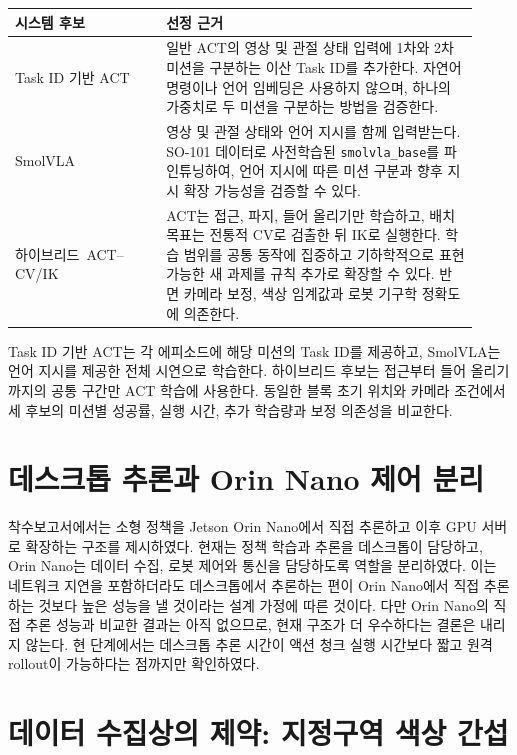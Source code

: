 \documentclass[titlepage]{pnureport}
\begin{document}
\begingroup
\small
\begin{longtable}{>{\raggedright\arraybackslash}p{0.30\linewidth}p{0.62\linewidth}}
\toprule
시스템 후보 & 선정 근거 \\
\midrule
\endhead
Task ID 기반 ACT & 일반 ACT의 영상 및 관절 상태 입력에 1차와 2차 미션을 구분하는 이산 Task ID를 추가한다. 자연어 명령이나 언어 임베딩은 사용하지 않으며, 하나의 가중치로 두 미션을 구분하는 방법을 검증한다. \\
SmolVLA & 영상 및 관절 상태와 언어 지시를 함께 입력받는다. SO-101 데이터로 사전학습된 \texttt{smolvla\_base}를 파인튜닝하여, 언어 지시에 따른 미션 구분과 향후 지시 확장 가능성을 검증할 수 있다. \\
\mbox{하이브리드 ACT--CV/IK} & ACT는 접근, 파지, 들어 올리기만 학습하고, 배치 목표는 전통적 CV로 검출한 뒤 IK로 실행한다. 학습 범위를 공통 동작에 집중하고 기하학적으로 표현 가능한 새 과제를 규칙 추가로 확장할 수 있다. 반면 카메라 보정, 색상 임계값과 로봇 기구학 정확도에 의존한다. \\
\bottomrule
\end{longtable}
\endgroup

Task ID 기반 ACT는 각 에피소드에 해당 미션의 Task ID를 제공하고, SmolVLA는 언어 지시를 제공한 전체 시연으로 학습한다. 하이브리드 후보는 접근부터 들어 올리기까지의 공통 구간만 ACT 학습에 사용한다. 동일한 블록 초기 위치와 카메라 조건에서 세 후보의 미션별 성공률, 실행 시간, 추가 학습량과 보정 의존성을 비교한다.

\section{데스크톱 추론과 Orin Nano 제어 분리}

착수보고서에서는 소형 정책을 Jetson Orin Nano에서 직접 추론하고 이후 GPU 서버로 확장하는 구조를 제시하였다. 현재는 정책 학습과 추론을 데스크톱이 담당하고, Orin Nano는 데이터 수집, 로봇 제어와 통신을 담당하도록 역할을 분리하였다. 이는 네트워크 지연을 포함하더라도 데스크톱에서 추론하는 편이 Orin Nano에서 직접 추론하는 것보다 높은 성능을 낼 것이라는 설계 가정에 따른 것이다. 다만 Orin Nano의 직접 추론 성능과 비교한 결과는 아직 없으므로, 현재 구조가 더 우수하다는 결론은 내리지 않는다. 현 단계에서는 데스크톱 추론 시간이 액션 청크 실행 시간보다 짧고 원격 rollout이 가능하다는 점까지만 확인하였다.

\section{데이터 수집상의 제약: 지정구역 색상 간섭}
\end{document}
